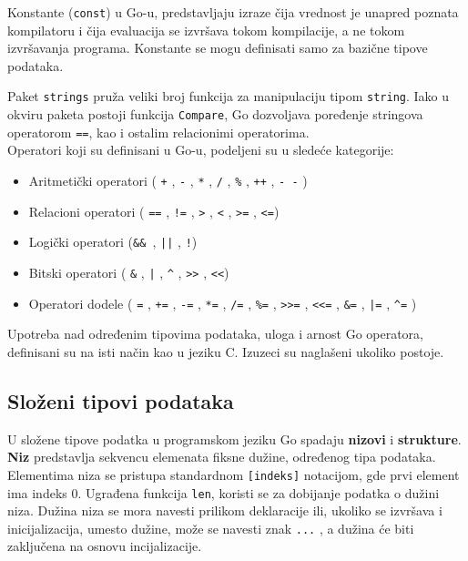 \documentclass[12pt,oneside]{memoir}
\begin{document}
Konstante (\texttt{const}) u Go-u, predstavljaju izraze čija vrednost je unapred poznata kompilatoru i čija evaluacija se izvršava tokom kompilacije, a ne tokom izvršavanja programa. Konstante se mogu definisati samo za bazične tipove podataka. 

Paket \texttt{strings} pruža veliki broj funkcija za manipulaciju tipom \texttt{string}. Iako u okviru paketa postoji funkcija \texttt{Compare}, Go dozvoljava poređenje stringova operatorom \texttt{==}, kao i ostalim relacionimi operatorima.
\\

Operatori koji su definisani u Go-u, podeljeni su u sledeće kategorije:
\begin{itemize}

\item Aritmetički operatori ( \texttt{+} ,  \texttt{-} , \texttt{*} ,  \texttt{/} ,  \texttt{\%} ,  \texttt{++} ,   \texttt{- -} )
\item Relacioni operatori ( \texttt{==} ,  \texttt{!=} ,  \texttt{>} ,  \texttt{<} ,  \texttt{>=} ,  \texttt{<=})
\item Logički operatori (\texttt{\&\& },  \texttt{||} ,  \texttt{!})
\item Bitski operatori ( \texttt{\&} ,  \texttt{|} ,  \texttt{\^} ,  \texttt{>{}>} ,  \texttt{<{}<})
\item Operatori dodele ( \texttt{=} ,  \texttt{+=} ,  \texttt{-=} ,  \texttt{*=} ,  \texttt{/=} ,  \texttt{\%=} ,   \texttt{>{}>=} ,  \texttt{<{}<=} ,  \texttt{\&=} ,  \texttt{|=} ,  \texttt{\^{}=} )

\end{itemize}

Upotreba nad određenim tipovima podataka, uloga i arnost Go operatora, definisani su na isti način kao u jeziku C. Izuzeci su naglašeni ukoliko postoje. 

\subsection{Složeni tipovi podataka}
U složene tipove podatka u programskom jeziku Go spadaju \textbf{nizovi} i \textbf{strukture}.
\\

\textbf{Niz} predstavlja sekvencu elemenata fiksne dužine, određenog tipa podataka. Elementima niza se pristupa standardnom \texttt{[indeks]} notacijom, gde prvi element ima indeks 0. Ugrađena funkcija \texttt{len}, koristi se za dobijanje podatka o dužini niza. Dužina niza se mora navesti prilikom deklaracije ili, ukoliko se izvršava i inicijalizacija, umesto dužine, može se navesti znak \texttt{...} , a dužina će biti zaključena na osnovu incijalizacije.
\end{document}
